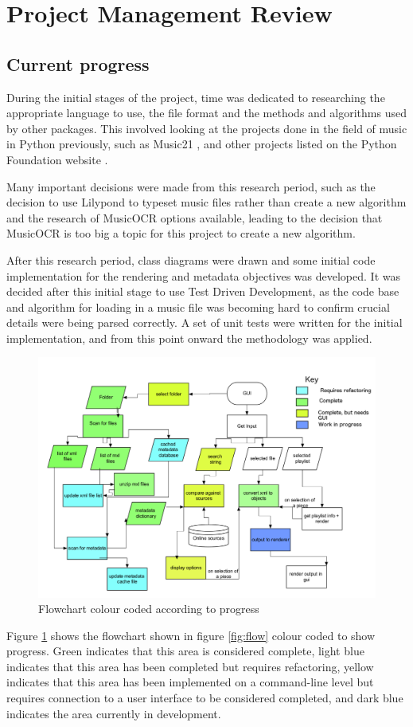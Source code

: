 \section{Project Management Review}
\subsection{Current progress}

During the initial stages of the project, time was dedicated to researching the appropriate language to use, the file format and the methods and algorithms used by other packages. This involved looking at the projects done in the field of music in Python previously, such as Music21 \parencite{Music21}, and other projects listed on the Python Foundation website \parencite{pmus}. 

Many important decisions were made from this research period, such as the decision to use Lilypond to typeset music files rather than create a new algorithm and the research of MusicOCR options available, leading to the decision that MusicOCR is too big a topic for this project to create a new algorithm.


After this research period, class diagrams were drawn and some initial code implementation for the rendering and metadata objectives was developed. It was decided after this initial stage to use Test Driven Development, as the code base and algorithm for loading in a music file was becoming hard to confirm crucial details were being parsed correctly. A set of unit tests were written for the initial implementation, and from this point onward the methodology was applied.

\begin{figure}[h]
    \centering
    \includegraphics[width=420pt]{flowchart-progress.png}
    \caption{Flowchart colour coded according to progress}
    \label{fig:colours}
\end{figure}
Figure \ref{fig:colours} shows the flowchart shown in figure \ref{fig:flow} colour coded to show progress. Green indicates that this area is considered complete, light blue indicates that this area has been completed but requires refactoring, yellow indicates that this area has been implemented on a command-line level but requires connection to a user interface to be considered completed, and dark blue indicates the area currently in development.

